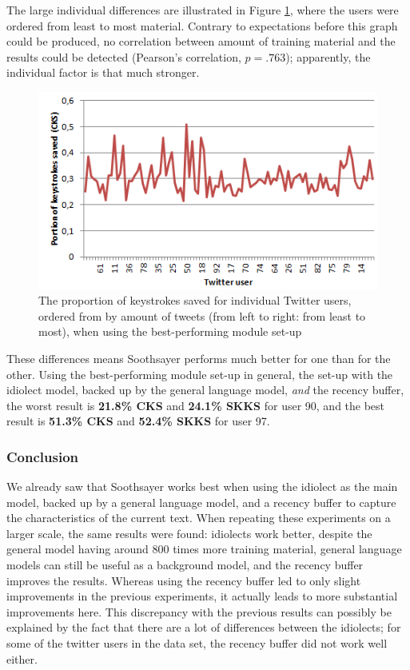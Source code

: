 \documentclass[11pt]{article}
\begin{document}
The large individual differences are illustrated in Figure \ref{chaos}, where the users were ordered from least to most material. Contrary to expectations before this graph could be produced, no correlation between amount of training material and the results could be detected (Pearson's correlation, $p = .763$); apparently, the individual factor is that much stronger.

\begin{figure}[H] \centering
\includegraphics[scale=1]{twitter_chaos}
\caption{The proportion of keystrokes saved for individual Twitter users, ordered from by amount of tweets (from left to right: from least to most), when using the best-performing module set-up}
\label{chaos}
\end{figure} 

These differences means Soothsayer performs much better for one than for the other. Using the best-performing module set-up in general, the set-up with the idiolect model, backed up by the general language model, \emph{and} the recency buffer, the worst result is \textbf{21.8\% CKS} and \textbf{24.1\% SKKS} for user 90, and the best result is \textbf{51.3\% CKS} and \textbf{52.4\% SKKS} for user 97.

\subsubsection{Conclusion}
We already saw that Soothsayer works best when using the idiolect as the main model, backed up by a general language model, and a recency buffer to capture the characteristics of the current text. When repeating these experiments on a larger scale, the same results were found: idiolects work better, despite the general model having around 800 times more training material, general language models can still be useful as a background model, and the recency buffer improves the results. Whereas using the recency buffer led to only slight improvements in the previous experiments, it actually leads to more substantial improvements here. This discrepancy with the previous results can possibly be explained by the fact that there are a lot of differences between the idiolects; for some of the twitter users in the data set, the recency buffer did not work well either.
\end{document}
